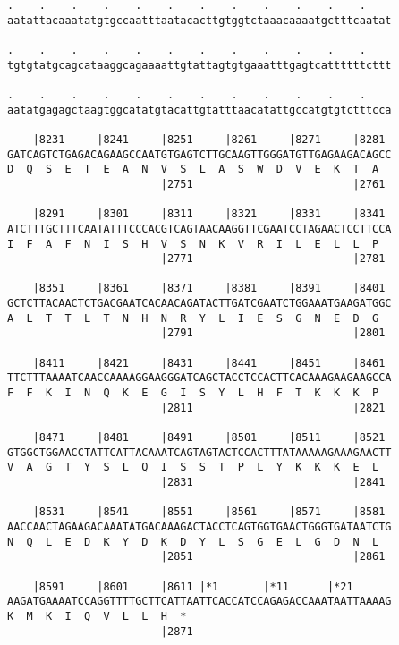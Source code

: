 \documentclass{article}
\begin{document}
\begin{Verbatim}
.    .    .    .    .    .    .    .    .    .    .    .    
aatattacaaatatgtgccaatttaatacacttgtggtctaaacaaaatgctttcaatat
                                                            
.    .    .    .    .    .    .    .    .    .    .    .    
tgtgtatgcagcataaggcagaaaattgtattagtgtgaaatttgagtcattttttcttt
                                                            
.    .    .    .    .    .    .    .    .    .    .    .    
aatatgagagctaagtggcatatgtacattgtatttaacatattgccatgtgtctttcca
                                                            
    |8231     |8241     |8251     |8261     |8271     |8281 
GATCAGTCTGAGACAGAAGCCAATGTGAGTCTTGCAAGTTGGGATGTTGAGAAGACAGCC
D  Q  S  E  T  E  A  N  V  S  L  A  S  W  D  V  E  K  T  A  
                        |2751                         |2761 
  
    |8291     |8301     |8311     |8321     |8331     |8341 
ATCTTTGCTTTCAATATTTCCCACGTCAGTAACAAGGTTCGAATCCTAGAACTCCTTCCA
I  F  A  F  N  I  S  H  V  S  N  K  V  R  I  L  E  L  L  P  
                        |2771                         |2781 
  
    |8351     |8361     |8371     |8381     |8391     |8401 
GCTCTTACAACTCTGACGAATCACAACAGATACTTGATCGAATCTGGAAATGAAGATGGC
A  L  T  T  L  T  N  H  N  R  Y  L  I  E  S  G  N  E  D  G  
                        |2791                         |2801 
  
    |8411     |8421     |8431     |8441     |8451     |8461 
TTCTTTAAAATCAACCAAAAGGAAGGGATCAGCTACCTCCACTTCACAAAGAAGAAGCCA
F  F  K  I  N  Q  K  E  G  I  S  Y  L  H  F  T  K  K  K  P  
                        |2811                         |2821 
  
    |8471     |8481     |8491     |8501     |8511     |8521 
GTGGCTGGAACCTATTCATTACAAATCAGTAGTACTCCACTTTATAAAAAGAAAGAACTT
V  A  G  T  Y  S  L  Q  I  S  S  T  P  L  Y  K  K  K  E  L  
                        |2831                         |2841 
  
    |8531     |8541     |8551     |8561     |8571     |8581 
AACCAACTAGAAGACAAATATGACAAAGACTACCTCAGTGGTGAACTGGGTGATAATCTG
N  Q  L  E  D  K  Y  D  K  D  Y  L  S  G  E  L  G  D  N  L  
                        |2851                         |2861 
  
    |8591     |8601     |8611 |*1       |*11      |*21      
AAGATGAAAATCCAGGTTTTGCTTCATTAATTCACCATCCAGAGACCAAATAATTAAAAG
K  M  K  I  Q  V  L  L  H  *   
                        |2871                               
  

\end{Verbatim}
\end{document}
